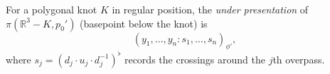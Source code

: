 For a polygonal knot $K$ in regular position, the \textit{under presentation} of $\pi(\mathbb{R}^3 - K, p_0')$ (basepoint below the knot) is
$$(y_1, \ldots, y_n : s_1, \ldots, s_n)_{\phi'},$$
where $s_j = (d_j \cdot u_j \cdot d_j^{-1})^\flat$ records the crossings around the $j$th overpass.
